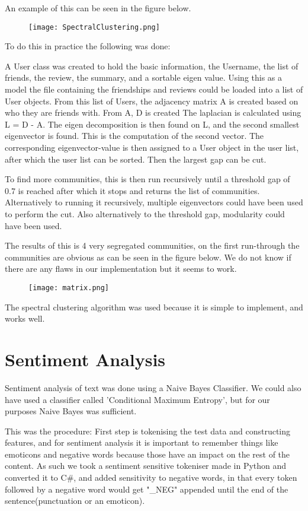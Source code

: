 	An example of this can be seen in the figure below.
	
	\begin{figure}[H]
	\texttt{[image: SpectralClustering.png]}
	\end{figure}
	
	To do this in practice the following was done:
	
	A User class was created to hold the basic information, the Username, the list of friends, the review, the summary, and a sortable eigen value. 
	Using this as a model the file containing the friendships and reviews could be loaded into a list of User objects.
	From this list of Users, the adjacency matrix A is created based on who they are friends with.
	From A, D is created
	The laplacian is calculated using L = D - A. 
	The eigen decomposition is then found on L, and the second smallest eigenvector is found. This is the computation of the second vector.
	The corresponding eigenvector-value is then assigned to a User object in the user list, after which the user list can be sorted.
	Then the largest gap can be cut. 
	
	To find more communities, this is then run recursively until a threshold gap of 0.7 is reached after which it stops and returns the list of communities. Alternatively to running it recursively, multiple eigenvectors could have been used to perform the cut. Also alternatively to the threshold gap, modularity could have been used.
	
	
	The results of this is 4 very segregated communities, on the first run-through the communities are obvious as can be seen in the figure below. We do not know if there are any flaws in our implementation but it seems to work.
	
	\begin{figure}[H]
	\texttt{[image: matrix.png]}
	\end{figure}
	
	The spectral clustering algorithm was used because it is simple to implement, and works well.
	
	\section{Sentiment Analysis}
	Sentiment analysis of text was done using a Naive Bayes Classifier. We could also have used a classifier called 'Conditional Maximum Entropy', but for our purposes Naive Bayes was sufficient.
	
	This was the procedure:
	First step is tokenising the test data and constructing features, and for sentiment analysis it is important to remember things like emoticons and negative words because those have an impact on the rest of the content. As such we took a sentiment sensitive tokeniser made in Python and converted it to C\#, and added sensitivity to negative words, in that every token followed by a negative word would get "\_NEG" appended until the end of the sentence(punctuation or an emoticon).
	
